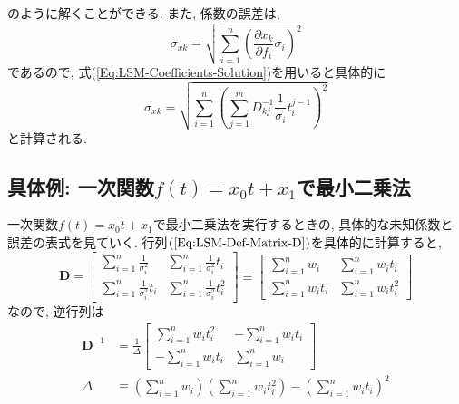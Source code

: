 のように解くことができる. 
また, 係数の誤差は, 
\begin{equation}
    \sigma_{xk}
    =
    \sqrt{
        \sum_{i=1}^{n}
        \left(\frac{\partial x_{k}}{\partial f_{i}} \sigma_{i}\right)^{2}
    }
\end{equation}
であるので, 式(\ref{Eq:LSM-Coefficients-Solution})を用いると具体的に
\begin{equation}
    \sigma_{xk}
    =
    \sqrt{
        \sum_{i=1}^{n}
        \left(
            \sum_{j=1}^{m} D_{kj}^{-1}
            \frac{1}{\sigma_{i}} t_{i}^{j-1}
        \right)^{2}
    }
\end{equation}
と計算される. 

\subsection{具体例: 一次関数$f(t) = x_{0} t + x_{1}$で最小二乗法}
一次関数$f(t) = x_{0} t + x_{1}$で最小二乗法を実行するときの, 具体的な未知係数と誤差の表式を見ていく. 
行列$(\ref{Eq:LSM-Def-Matrix-D})$を具体的に計算すると, 
\begin{equation}
    \bm{D}
    =
    \begin{bmatrix}
        \sum_{i=1}^{n} \frac{1}{\sigma_{i}^{2}} &
        \sum_{i=1}^{n} \frac{1}{\sigma_{i}^{2}} t_{i}
        \\
        \sum_{i=1}^{n} \frac{1}{\sigma_{i}^{2}} t_{i} &
        \sum_{i=1}^{n} \frac{1}{\sigma_{i}^{2}} t_{i}^{2}
    \end{bmatrix}
    \equiv
    \begin{bmatrix}
        \sum_{i=1}^{n} w_{i} &
        \sum_{i=1}^{n} w_{i} t_{i}
        \\
        \sum_{i=1}^{n} w_{i} t_{i} &
        \sum_{i=1}^{n} w_{i} t_{i}^{2}
    \end{bmatrix}
\end{equation}
なので, 逆行列は
\begin{align}
    \bm{D}^{-1}
    &=
    \frac{1}{\Delta}
    \begin{bmatrix}
        \sum_{i=1}^{n} w_{i} t_{i}^2&
        -\sum_{i=1}^{n} w_{i} t_{i}
        \\
        -\sum_{i=1}^{n} w_{i} t_{i} &
        \sum_{i=1}^{n} w_{i}
    \end{bmatrix}
    \\
    \Delta
    &\equiv
    \left(\sum_{i=1}^{n} w_{i}\right)
    \left(\sum_{i=1}^{n} w_{i} t_{i}^{2}\right)
    -
    \left(\sum_{i=1}^{n} w_{i} t_{i}\right)^{2}
\end{align}
